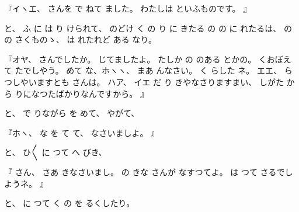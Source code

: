 %
『イヽエ、
%
さんを
で
ねて
ました。
%
わたしは
といふものです。
』

%
と、
%
ふ
に
は
り
けられて、
%
のどけ
く
の
り
に
きたる
の
の
に
れたるは、
%
の
の
さくものゝ、
%
は
れたれど
ある%
なり。

%
『オヤ、
%
さんでしたか。
%
じてましたよ。
%
たしか
の
のある
とかの。%
%
くおぼえて
たでしやう。
%
めて
な、ホヽヽ、
%
まあ
んなさい。
%
く
らした
ネ。
%
エエ、
%
らつしやいますとも
さんは。
%
ハア、
%
イエ
だ
り
きやなさりますまい、
%
しがた
から
りになつたばかりなんですから。
』

%
と、
%
で
りながら
を
めて、
%
やがて、

%
『ホヽ、
%
な
を
て
て、
%
なさいましよ。
』

%
と、
%
ひ〳〵
に
つて
へ
びき、

%
『
さん、
%
さあ
きなさいまし。
%
の
きな
さんが
なすつてよ。
%
は
つて
さるでしようネ。
』

%
と、
%
に
つて
く
の
を
るくしたり。

